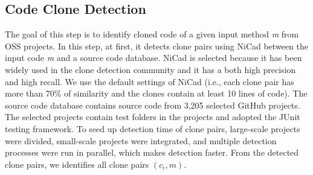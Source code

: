 \documentclass[conference]{IEEEtran}
\begin{document}
\subsection{Code Clone Detection}
The goal of this step is to identify cloned code of a given input method \textit{m} from OSS projects. In this step, at first, it detects clone pairs using \textsf{NiCad}\cite{b2} between the input code \textit{m} and a source code database. \textsf{NiCad} is selected because it has been widely used in the clone detection community and it has a both high precision and high recall. We use the default settings of \textsf{NiCad} (i.e., each clone pair has more than 70\% of similarity and the clones contain at least 10 lines of code). The source code database contains source code from 3,205 selected GitHub projects. The selected projects contain test folders in the projects and adopted the JUnit testing framework. To seed up detection time of clone pairs, large-scale projects were divided, small-scale projects were integrated, and multiple detection processes were run in parallel, which makes  detection faster. From the detected clone pairs, we identifies all clone pairs $\left(c_{i}, m\right) $.
\end{document}
